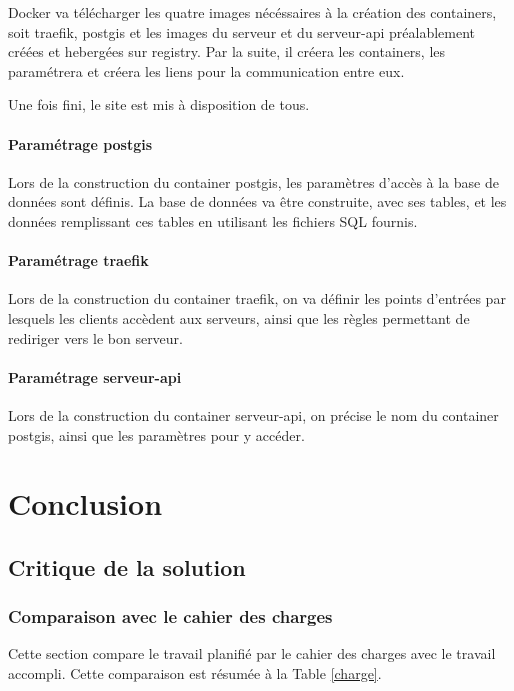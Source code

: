 \documentclass[
    iai, %
    il, %
]{heig-tb}
\begin{document}
Docker va télécharger les quatre images nécéssaires à la création des containers, soit \gls{traefik},
\gls{postgis} et les images du serveur et du serveur-api préalablement créées et hebergées sur \gls{registry}.
Par la suite, il créera les containers, les paramétrera et créera les liens pour la communication entre eux.

Une fois fini, le site est mis à disposition de tous.

\subsubsection{Paramétrage \gls{postgis}}
Lors de la construction du container \gls{postgis}, les paramètres d'accès à la base de données sont définis.
La base de données va être construite, avec ses tables, et les données remplissant ces tables en utilisant les fichiers SQL fournis.

\subsubsection{Paramétrage \gls{traefik}}
Lors de la construction du container \gls{traefik}, on va définir les points d'entrées par lesquels les clients accèdent aux serveurs,
ainsi que les règles permettant de rediriger vers le bon serveur.

\subsubsection{Paramétrage serveur-api}
Lors de la construction du container serveur-api, on précise le nom du container \gls{postgis},
ainsi que les paramètres pour y accéder.

\chapter{Conclusion}

\section{Critique de la solution}

\subsection{Comparaison avec le cahier des charges}
Cette section compare le travail planifié par le cahier des charges avec le travail accompli.
Cette comparaison est résumée à la Table \ref{charge}.
\end{document}
